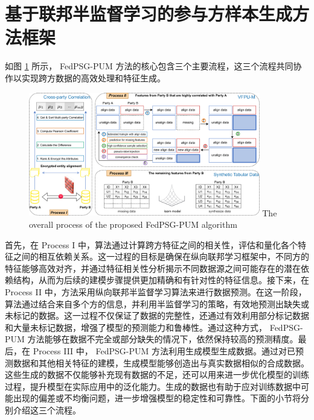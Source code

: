\section{基于联邦半监督学习的参与方样本生成方法框架}
如图 \ref{fig: FedPSG-PUM} 所示， FedPSG-PUM  方法的核心包含三个主要流程，这三个流程共同协作以实现跨方数据的高效处理和特征生成。

\vspace{-0.1cm}
\begin{figure}[h]  %
	\centering     %
	\includegraphics[width=0.9\textwidth]{chapters/imgs/FedPSG-PUM }  
	{\wuhao The overall process of the proposed  FedPSG-PUM  algorithm}
	\label{fig: FedPSG-PUM}  %
\end{figure}
\vspace{-0.35cm}

首先，在 Process I 中，算法通过计算跨方特征之间的相关性，评估和量化各个特征之间的相互依赖关系。这一过程的目标是确保在纵向联邦学习框架中，不同方的特征能够高效对齐，并通过特征相关性分析揭示不同数据源之间可能存在的潜在依赖结构，从而为后续的建模步骤提供更加精确和有针对性的特征信息。接下来，在 Process II 中，方法采用纵向联邦半监督学习算法来进行数据预测。在这一阶段，算法通过结合来自多个方的信息，并利用半监督学习的策略，有效地预测出缺失或未标记的数据。这一过程不仅保证了数据的完整性，还通过有效利用部分标记数据和大量未标记数据，增强了模型的预测能力和鲁棒性。通过这种方式， FedPSG-PUM  方法能够在数据不完全或部分缺失的情况下，依然保持较高的预测精度。最后，在 Process III 中， FedPSG-PUM  方法利用生成模型生成数据。通过对已预测数据和其他相关特征的建模，生成模型能够创造出与真实数据相似的合成数据。这些生成的数据不仅能够补充现有数据的不足，还可以用来进一步优化模型的训练过程，提升模型在实际应用中的泛化能力。生成的数据也有助于应对训练数据中可能出现的偏差或不均衡问题，进一步增强模型的稳定性和可靠性。下面的小节将分别介绍这三个流程。



